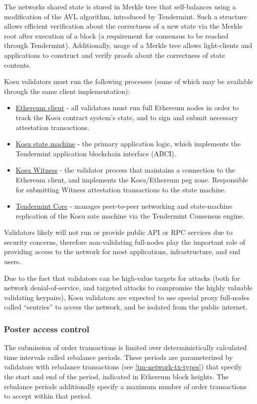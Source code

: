 \documentclass[10pt]{article}
\begin{document}
The networks shared state is stored in Merkle tree that self-balances using a modification of the AVL algorithm, introduced by Tendermint\cite{tendermint-iavl}. Such a structure allows efficient verification about the correctness of a new state via the Merkle root after execution of a block (a requirement for consensus to be reached through Tendermint). Additionally, usage of a Merkle tree allows light-clients and applications to construct and verify proofs about the correctness of state contents.
\medskip

Kosu validators must run the following processes (some of which may be available through the same client implementation):

\begin{itemize}
  \item \underline{Ethereum client} - all validators must run full Ethereum nodes in order to track the Kosu contract system’s state, and to sign and submit necessary attestation transactions.
  \item \underline{Kosu state machine} - the primary application logic, which implements the Tendermint application blockchain interface (ABCI)\cite{tendermint-abci-spec}.
  \item \underline{Kosu Witness} - the validator process that maintains a connection to the Ethereum client, and implements the Kosu/Ethereum peg zone. Responsible for submitting Witness attestation transactions to the state machine.
  \item \underline{Tendermint Core} - manages peer-to-peer networking and state-machine replication of the Kosu sate machine via the Tendermint Consensus engine.
\end{itemize}

Validators likely will not run or provide public API or RPC services due to security concerns, therefore non-validating full-nodes play the important role of providing access to the network for most applications, infrastructure, and end users.
\medskip

Due to the fact that validators can be high-value targets for attacks (both for network denial-of-service, and targeted attacks to compromise the highly valuable validating keypairs), Kosu validators are expected to use special proxy full-nodes called ``sentries'' to access the network, and be isolated from the public internet\cite{sentry-architecture}.
\subsubsection{Poster access control}\label{tm-network-access}
The submission of order transactions is limited over deterministically calculated time intervals called rebalance periods. These periods are parameterized by validators with rebalance transactions (see \ref{tm-network-tx-types}) that specify the start and end of the period, indicated in Ethereum block heights. The rebalance periods additionally specify a maximum number of order transactions to accept within that period. 
\medskip
\end{document}
